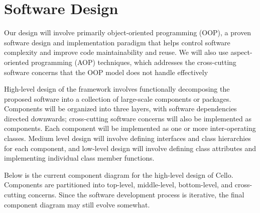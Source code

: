 \documentclass[11pt,letterpaper]{article}
\newcommand{\cello}{\textsf{Cello}}
\begin{document}
\section{Software Design} \label{s:design}


Our design will involve primarily object-oriented programming (OOP), a
proven software design and implementation paradigm that helps control
software complexity and improve code maintainability and reuse.  We
will also use aspect-oriented programming (AOP) techniques, which
addresses the cross-cutting software concerns that the OOP model does
not handle effectively

High-level design of the framework involves functionally decomposing
the proposed software into a collection of large-scale components or
packages.  Components will be organized into three layers, with
software dependencies directed downwards; cross-cutting software
concerns will also be implemented as components.  Each component will
be implemented as one or more inter-operating classes.  Medium level
design will involve defining interfaces and class hierarchies for each
component, and low-level design will involve defining class attributes
and implementing individual class member functions.

Below is the current component diagram for the high-level design of
\cello.  Components are partitioned into top-level, middle-level,
bottom-level, and cross-cutting concerns.  Since the software development
process is iterative, the final component diagram may still evolve
somewhat.

\end{document}
